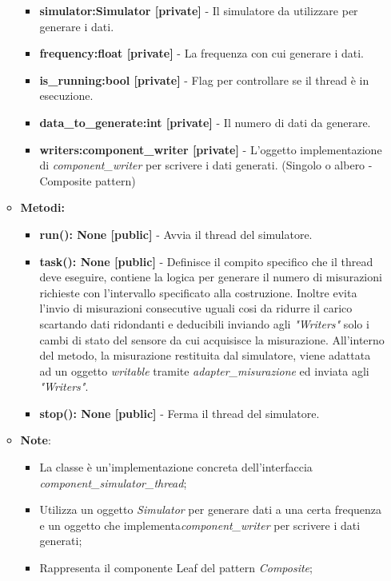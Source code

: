 \begin{itemize}
\begin{itemize}
        \begin{itemize}
            \item \textbf{simulator:Simulator [private]} - Il simulatore da utilizzare per generare i dati.
            \item \textbf{frequency:float [private]} - La frequenza con cui generare i dati.
            \item \textbf{is\_running:bool [private]} - Flag per controllare se il thread è in esecuzione.
            \item \textbf{data\_to\_generate:int [private]} - Il numero di dati da generare.
            \item \textbf{writers:component\_writer [private]} - L'oggetto implementazione di \textit{component\_writer} per scrivere i dati generati. (Singolo o albero - Composite pattern)
        \end{itemize}
        \item \textbf{Metodi: }
        \begin{itemize}
            \item \textbf{run(): None [public]} - Avvia il thread del simulatore.
            \item \textbf{task(): None [public]} - Definisce il compito specifico che il thread deve eseguire, contiene la logica per generare il numero di misurazioni richieste con l'intervallo specificato alla costruzione.
            Inoltre evita l'invio di misurazioni consecutive uguali cosi da ridurre il carico scartando dati ridondanti e deducibili inviando agli \textit{"Writers"} solo i cambi di stato del sensore da cui acquisisce la misurazione.
            All'interno del metodo, la misurazione restituita dal simulatore, viene adattata ad un oggetto \textit{writable} tramite \textit{adapter\_misurazione} ed inviata agli \textit{"Writers"}.
            \item \textbf{stop(): None [public]} - Ferma il thread del simulatore.
        \end{itemize}
        \item\textbf{Note}:
        \begin{itemize}
            \item La classe è un'implementazione concreta dell'interfaccia \textit{component\_simulator\_thread};
            \item Utilizza un oggetto \textit{Simulator} per generare dati a una certa frequenza e un oggetto che implementa\textit{component\_writer} per scrivere i dati generati;
            \item Rappresenta il componente Leaf del pattern \textit{Composite};

\end{itemize}
\end{itemize}
\end{itemize}
